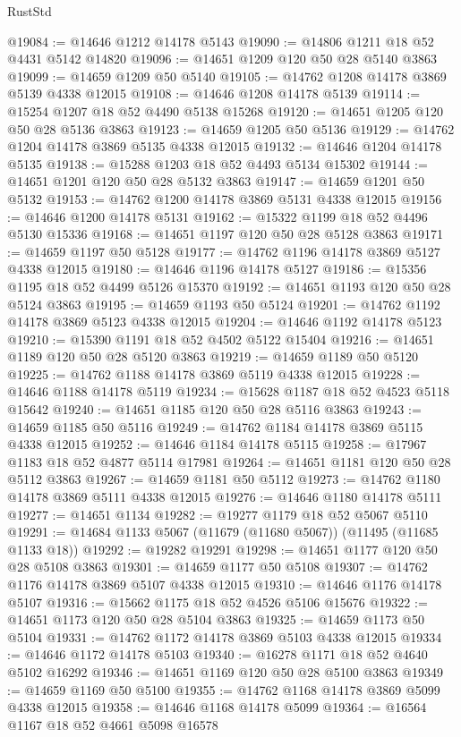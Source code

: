 \begin{lexlean}{RustStd}
\begin{coremodule}
@19084 := @14646 @1212 @14178 @5143
@19090 := @14806 @1211 @18 @52 @4431 @5142 @14820
@19096 := @14651 @1209 @120 @50 @28 @5140 @3863
@19099 := @14659 @1209 @50 @5140
@19105 := @14762 @1208 @14178 @3869 @5139 @4338 @12015
@19108 := @14646 @1208 @14178 @5139
@19114 := @15254 @1207 @18 @52 @4490 @5138 @15268
@19120 := @14651 @1205 @120 @50 @28 @5136 @3863
@19123 := @14659 @1205 @50 @5136
@19129 := @14762 @1204 @14178 @3869 @5135 @4338 @12015
@19132 := @14646 @1204 @14178 @5135
@19138 := @15288 @1203 @18 @52 @4493 @5134 @15302
@19144 := @14651 @1201 @120 @50 @28 @5132 @3863
@19147 := @14659 @1201 @50 @5132
@19153 := @14762 @1200 @14178 @3869 @5131 @4338 @12015
@19156 := @14646 @1200 @14178 @5131
@19162 := @15322 @1199 @18 @52 @4496 @5130 @15336
@19168 := @14651 @1197 @120 @50 @28 @5128 @3863
@19171 := @14659 @1197 @50 @5128
@19177 := @14762 @1196 @14178 @3869 @5127 @4338 @12015
@19180 := @14646 @1196 @14178 @5127
@19186 := @15356 @1195 @18 @52 @4499 @5126 @15370
@19192 := @14651 @1193 @120 @50 @28 @5124 @3863
@19195 := @14659 @1193 @50 @5124
@19201 := @14762 @1192 @14178 @3869 @5123 @4338 @12015
@19204 := @14646 @1192 @14178 @5123
@19210 := @15390 @1191 @18 @52 @4502 @5122 @15404
@19216 := @14651 @1189 @120 @50 @28 @5120 @3863
@19219 := @14659 @1189 @50 @5120
@19225 := @14762 @1188 @14178 @3869 @5119 @4338 @12015
@19228 := @14646 @1188 @14178 @5119
@19234 := @15628 @1187 @18 @52 @4523 @5118 @15642
@19240 := @14651 @1185 @120 @50 @28 @5116 @3863
@19243 := @14659 @1185 @50 @5116
@19249 := @14762 @1184 @14178 @3869 @5115 @4338 @12015
@19252 := @14646 @1184 @14178 @5115
@19258 := @17967 @1183 @18 @52 @4877 @5114 @17981
@19264 := @14651 @1181 @120 @50 @28 @5112 @3863
@19267 := @14659 @1181 @50 @5112
@19273 := @14762 @1180 @14178 @3869 @5111 @4338 @12015
@19276 := @14646 @1180 @14178 @5111
@19277 := @14651 @1134
@19282 := @19277 @1179 @18 @52 @5067 @5110
@19291 := @14684 @1133 @5067 (@11679 (@11680 @5067)) (@11495 (@11685 @1133 @18))
@19292 := @19282 @19291
@19298 := @14651 @1177 @120 @50 @28 @5108 @3863
@19301 := @14659 @1177 @50 @5108
@19307 := @14762 @1176 @14178 @3869 @5107 @4338 @12015
@19310 := @14646 @1176 @14178 @5107
@19316 := @15662 @1175 @18 @52 @4526 @5106 @15676
@19322 := @14651 @1173 @120 @50 @28 @5104 @3863
@19325 := @14659 @1173 @50 @5104
@19331 := @14762 @1172 @14178 @3869 @5103 @4338 @12015
@19334 := @14646 @1172 @14178 @5103
@19340 := @16278 @1171 @18 @52 @4640 @5102 @16292
@19346 := @14651 @1169 @120 @50 @28 @5100 @3863
@19349 := @14659 @1169 @50 @5100
@19355 := @14762 @1168 @14178 @3869 @5099 @4338 @12015
@19358 := @14646 @1168 @14178 @5099
@19364 := @16564 @1167 @18 @52 @4661 @5098 @16578

\end{coremodule}
\end{lexlean}
